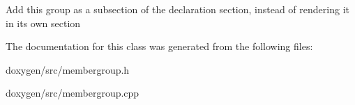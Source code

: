 Add this group as a subsection of the declaration section, instead of rendering it in its own section 

The documentation for this class was generated from the following files\+:\begin{DoxyCompactItemize}
\item 
doxygen/src/membergroup.\+h\item 
doxygen/src/membergroup.\+cpp\end{DoxyCompactItemize}
